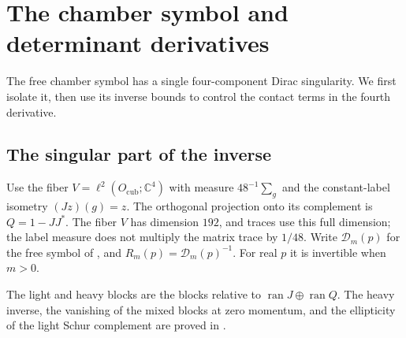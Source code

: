 \documentclass[11pt,letterpaper,reqno]{amsart}
\newcommand{\C}{\mathbb C}
\begin{document}
\section{The chamber symbol and determinant derivatives}\label{subsec:response-bloch}\label{sec:free-response}

The free chamber symbol has a single four-component Dirac singularity.
We first isolate it, then use its inverse bounds to control the contact
terms in the fourth derivative.

\subsection{The singular part of the inverse}

Use the fiber $V=\ell^2(O_{\mathrm{cub}};\C^4)$ with measure
$48^{-1}\sum_g$ and the constant-label isometry $(Jz)(g)=z$.
The orthogonal projection onto its complement is $Q=1-JJ^*$.
The fiber $V$ has dimension $192$, and traces use this full dimension;
the label measure does not multiply the matrix trace by
$1/48$. Write $\mathcal D_m(p)$ for the free symbol of
\cite[\S2.2]{FermionBlock}, and $R_m(p)=\mathcal D_m(p)^{-1}$.
For real $p$ it is invertible when $m>0$.

The light and heavy blocks are the blocks relative to
$\operatorname{ran}J\oplus\operatorname{ran}Q$. The heavy inverse,
the vanishing of the mixed blocks at zero momentum, and the
ellipticity of the light Schur complement are proved in
\cite[Proposition~2.2]{FermionBlock}.
\end{document}
